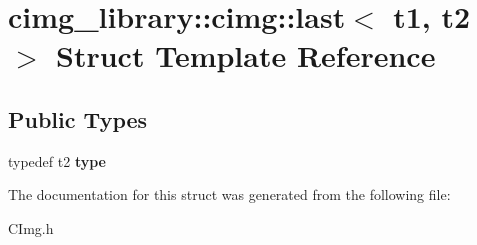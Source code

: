 \hypertarget{structcimg__library_1_1cimg_1_1last}{\section{cimg\-\_\-library\-:\-:cimg\-:\-:last$<$ t1, t2 $>$ Struct Template Reference}
\label{structcimg__library_1_1cimg_1_1last}
}
\subsection*{Public Types}
\begin{DoxyCompactItemize}
\item 
\hypertarget{structcimg__library_1_1cimg_1_1last_a0db493bd11bc2249a3ab6bd8b92cddd2}{typedef t2 {\bfseries type}}\label{structcimg__library_1_1cimg_1_1last_a0db493bd11bc2249a3ab6bd8b92cddd2}

\end{DoxyCompactItemize}


The documentation for this struct was generated from the following file\-:\begin{DoxyCompactItemize}
\item 
C\-Img.\-h\end{DoxyCompactItemize}
